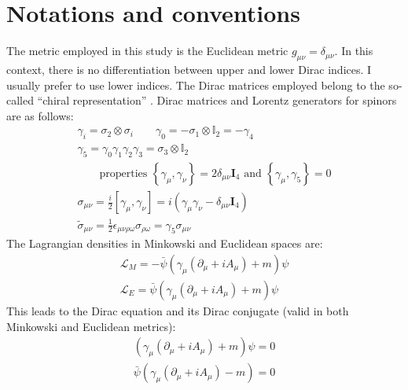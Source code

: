 \documentclass[english, LaM, oneside, noexaminfo]{sapthesis}
\begin{document}
\chapter{Notations and conventions}\label{app:notations}
\noindent
The metric employed in this study is the Euclidean metric $g_{\mu\nu} = \delta_{\mu\nu}$.
In this context, there is no differentiation between upper and lower Dirac indices.
I usually prefer to use lower indices.
\newline\newline
The Dirac matrices employed belong to the so-called ``chiral representation'' \cite{Itzykson-Zuber}.
Dirac matrices and Lorentz generators for spinors are as follows:
\begin{equation*}
    \begin{gathered}
        \gamma_i = \sigma_2 \otimes \sigma_i \qquad \gamma_0 = - \sigma_1 \otimes \mathbb{I}_2 = -\gamma_4 \\
        \gamma_5 = \gamma_0 \gamma_1 \gamma_2 \gamma_3 = \sigma_3 \otimes \mathbb{I}_2 \\
        \qquad \text{properties } \left\{ \gamma_\mu , \gamma_\nu \right\} = 2 \delta_{\mu\nu} \mathbf{I}_4 \text{ and } \left\{ \gamma_\mu , \gamma_5 \right\} = 0 \\
        \sigma_{\mu\nu} = \frac{i}{2} \left[\gamma_\mu , \gamma_\nu\right] = i \left(\gamma_\mu \gamma_\nu - \delta_{\mu\nu} \mathbf{I}_4\right) \\
        \tilde{\sigma}_{\mu\nu} = \frac{1}{2}\epsilon_{\mu\nu\rho\omega}\sigma_{\rho\omega} = \gamma_5 \sigma_{\mu\nu} 
    \end{gathered}
\end{equation*}
The Lagrangian densities in Minkowski and Euclidean spaces are:
\begin{equation*}
    \begin{gathered}
        \mathcal{L}_M = - \bar{\psi} \left( \gamma_\mu \left( \partial_\mu + i A_\mu \right) + m \right) \psi \\
        \mathcal{L}_E = \bar{\psi} \left( \gamma_\mu \left( \partial_\mu + i A_\mu \right) + m \right) \psi
    \end{gathered}
\end{equation*}
This leads to the Dirac equation and its Dirac conjugate (valid in both Minkowski and Euclidean metrics):
\begin{equation*}
    \begin{gathered}
        \left( \gamma_\mu \left( \partial_\mu + i A_\mu \right) + m \right) \psi = 0 \\
        \bar{\psi} \left( \gamma_\mu \left( \partial_\mu + i A_\mu \right) - m \right) = 0
    \end{gathered}
\end{equation*}
\end{document}
